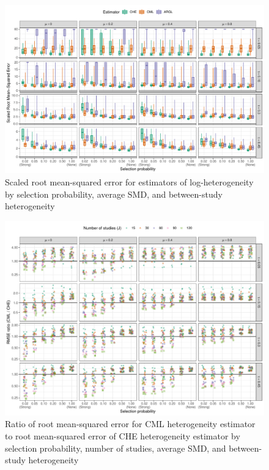 \documentclass[
  man, donotrepeattitle,floatsintext]{apa7}
\begin{document}
\begin{figure}
\includegraphics{selection_models_draft_files/figure-latex/heterogeneity-rmse-1} \caption{Scaled root mean-squared error for estimators of log-heterogeneity by selection probability, average SMD, and between-study heterogeneity}\label{fig:heterogeneity-rmse}
\end{figure}
\begin{figure}
\includegraphics{selection_models_draft_files/figure-latex/heterogeneity-rmse-CML-CHE-1} \caption{Ratio of root mean-squared error for CML heterogeneity estimator to root mean-squared error of CHE heterogeneity estimator by selection probability, number of studies, average SMD, and between-study heterogeneity}\label{fig:heterogeneity-rmse-CML-CHE}
\end{figure}
\end{document}
